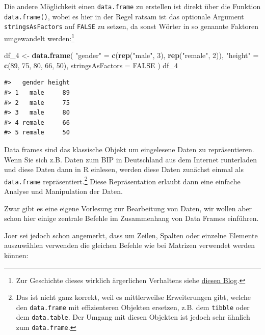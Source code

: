 \documentclass[]{book}
\newenvironment{Shaded}{\begin{snugshade}}{\end{snugshade}}
\newcommand{\KeywordTok}[1]{\textcolor[rgb]{0.13,0.29,0.53}{\textbf{#1}}}
\newcommand{\DataTypeTok}[1]{\textcolor[rgb]{0.13,0.29,0.53}{#1}}
\newcommand{\DecValTok}[1]{\textcolor[rgb]{0.00,0.00,0.81}{#1}}
\newcommand{\StringTok}[1]{\textcolor[rgb]{0.31,0.60,0.02}{#1}}
\newcommand{\OtherTok}[1]{\textcolor[rgb]{0.56,0.35,0.01}{#1}}
\newcommand{\NormalTok}[1]{#1}
\let\rmarkdownfootnote\footnote%
\def\footnote{\protect\rmarkdownfootnote}
\begin{document}
Die andere Möglichkeit einen \texttt{data.frame} zu erstellen ist direkt
über die Funktion \texttt{data.frame()}, wobei es hier in der Regel
ratsam ist das optionale Argument \texttt{stringsAsFactors} auf
\texttt{FALSE} zu setzen, da sonst Wörter in so genannte Faktoren
umgewandelt werden:\footnote{Zur Geschichte dieses wirklich ärgerlichen
  Verhaltens siehe
  \href{https://simplystatistics.org/2015/07/24/stringsasfactors-an-unauthorized-biography/}{diesen
  Blog}.}

\begin{Shaded}
\begin{Highlighting}[]
\NormalTok{df_}\DecValTok{4}\NormalTok{ <-}\StringTok{ }\KeywordTok{data.frame}\NormalTok{(}
  \StringTok{"gender"}\NormalTok{ =}\StringTok{ }\KeywordTok{c}\NormalTok{(}\KeywordTok{rep}\NormalTok{(}\StringTok{"male"}\NormalTok{, }\DecValTok{3}\NormalTok{), }\KeywordTok{rep}\NormalTok{(}\StringTok{"remale"}\NormalTok{, }\DecValTok{2}\NormalTok{)),}
  \StringTok{"height"}\NormalTok{ =}\StringTok{ }\KeywordTok{c}\NormalTok{(}\DecValTok{89}\NormalTok{, }\DecValTok{75}\NormalTok{, }\DecValTok{80}\NormalTok{, }\DecValTok{66}\NormalTok{, }\DecValTok{50}\NormalTok{),}
  \DataTypeTok{stringsAsFactors =} \OtherTok{FALSE}
\NormalTok{)}
\NormalTok{df_}\DecValTok{4}
\end{Highlighting}
\end{Shaded}

\begin{verbatim}
#>   gender height
#> 1   male     89
#> 2   male     75
#> 3   male     80
#> 4 remale     66
#> 5 remale     50
\end{verbatim}

Data frames sind das klassische Objekt um eingelesene Daten zu
repräsentieren. Wenn Sie sich z.B. Daten zum BIP in Deutschland aus dem
Internet runterladen und diese Daten dann in R einlesen, werden diese
Daten zunächst einmal als \texttt{data.frame} repräsentiert.\footnote{Das
  ist nicht ganz korrekt, weil es mittlerweilse Erweiterungen gibt,
  welche den \texttt{data.frame} mit effizienteren Objekten ersetzen,
  z.B. dem \texttt{tibble} oder dem \texttt{data.table}. Der Umgang mit
  diesen Objekten ist jedoch sehr ähnlich zum \texttt{data.frame}.}
Diese Repräsentation erlaubt dann eine einfache Analyse und Manipulation
der Daten.

Zwar gibt es eine eigene Vorlesung zur Bearbeitung von Daten, wir wollen
aber schon hier einige zentrale Befehle im Zusammenhang von Data Frames
einführen.

Joer sei jedoch schon angemerkt, dass um Zeilen, Spalten oder einzelne
Elemente auszuwählen verwenden die gleichen Befehle wie bei Matrizen
verwendet werden können:
\end{document}

